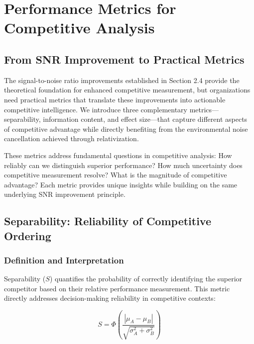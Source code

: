 
\section{Performance Metrics for Competitive Analysis}

\subsection{From SNR Improvement to Practical Metrics}

The signal-to-noise ratio improvements established in Section 2.4 provide the theoretical foundation for enhanced competitive measurement, but organizations need practical metrics that translate these improvements into actionable competitive intelligence. We introduce three complementary metrics—separability, information content, and effect size—that capture different aspects of competitive advantage while directly benefiting from the environmental noise cancellation achieved through relativization.

These metrics address fundamental questions in competitive analysis: How reliably can we distinguish superior performance? How much uncertainty does competitive measurement resolve? What is the magnitude of competitive advantage? Each metric provides unique insights while building on the same underlying SNR improvement principle.

\subsection{Separability: Reliability of Competitive Ordering}

\subsubsection{Definition and Interpretation}

Separability ($S$) quantifies the probability of correctly identifying the superior competitor based on their relative performance measurement. This metric directly addresses decision-making reliability in competitive contexts:

\begin{equation}
S = \Phi\left(\frac{|\mu_A - \mu_B|}{\sqrt{\sigma_A^2 + \sigma_B^2}}\right)
\end{equation}

